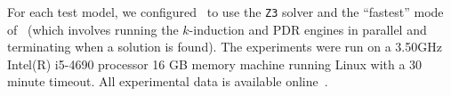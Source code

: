 For each test model, we configured \jkind\ to use the \texttt{Z3} solver and the ``fastest'' mode of \jkind\ (which involves running the $k$-induction and PDR engines in parallel and terminating when a solution is found). The experiments were run on a  3.50GHz  Intel(R) i5-4690 processor 16 GB memory machine running Linux with a 30 minute timeout.  All experimental data is available online~\cite{expr}.


%



